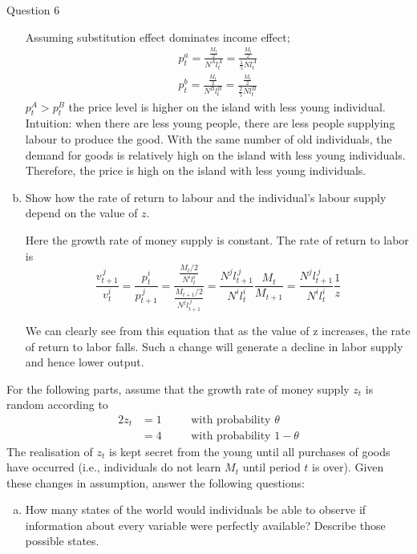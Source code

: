 \documentclass[a4paper]{article}
\newif\IfInSansMode
\numberwithin{equation}{section}
\numberwithin{figure}{section}
\begin{document}
\begin{questionbox}{Question 6}
\begin{enumerate}[(a)]
\begin{explanationbox}
\[				\]
				Assuming substitution effect dominates income effect;
				\begin{gather*}
					p_t^a = \frac{\frac{M_t}{2}}{N^A l_t^A} = \frac{\frac{M_t}{2}}{\frac{1}{5}N l_t^A}\\ 
					p_t^b = \frac{\frac{M_t}{2}}{N^B l_t^B} = \frac{\frac{M_t}{2}}{\frac{2}{5}N l_t^B}
				\end{gather*}
				\( p_t^A > p_t^B \) the price level is higher on the island with less young individual. Intuition: when there are less young people, there are less people supplying labour to produce the good. With the same number of old individuals, the demand for goods is relatively high on the island with less young individuals. Therefore, the price is high on the island with less young individuals.
			\end{explanationbox}
			\item Show how the rate of return to labour and the individual's labour supply depend on the value of \( z \).
			\begin{explanationbox}
				Here the growth rate of money supply is constant. The rate of return to labor is
				\[
					\frac{v_{t+1}^{\,j}}{v_t^i} = \frac{p_t^i}{p_{t+1}^{\,j}} = \frac{\frac{M_t/2}{N^i l_t^i}}{\frac{M_{t+1} / 2}{N^j l_{t+1}^{\,j}}} = \frac{N^j l_{t+1}^{\,j}}{N^i l_t^i} \frac{M_t}{M_{t+1}}=\frac{N^j l_{t+1}^{\,j}}{N^i l_t^i} \frac{1}{z}
				\]
			\end{explanationbox}
			\begin{explanationbox}
				We can clearly see from this equation that as the value of z increases, the rate of return to labor falls. Such a change will generate a decline in labor supply and hence lower output.
			\end{explanationbox}
		\end{enumerate}
		For the following parts, assume that the growth rate of money supply \( z_t \) is random according to
		\begin{alignat*}{2}
			z_t &= 1 &\quad&\text{with probability } \theta \\
			&= 4 &\quad&\text{with probability } 1- \theta
		\end{alignat*}
		The realisation of \( z_t \) is kept secret from the young until all purchases of goods have occurred (i.e., individuals do not learn \( M_t \) until period \( t \) is over). Given these changes in assumption, answer the following questions:
		\begin{enumerate}[(a), resume]
			\item How many states of the world would individuals be able to observe if information about every variable were perfectly available? Describe those possible states.

\end{enumerate}
\end{questionbox}
\end{document}
